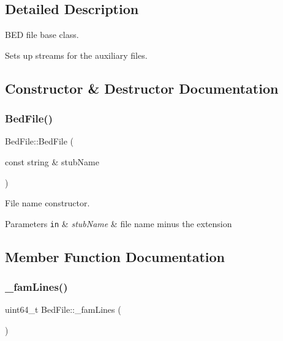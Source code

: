 \subsection{Detailed Description}
B\+ED file base class. 

Sets up streams for the auxiliary files. 

\subsection{Constructor \& Destructor Documentation}
\mbox{\label{classvarfiles_1_1_bed_file_a69631d96080c22e686e8acb75cf2cc89}} 
\subsubsection{\texorpdfstring{Bed\+File()}{BedFile()}}
{\footnotesize\ttfamily Bed\+File\+::\+Bed\+File (\begin{DoxyParamCaption}\item[{const string \&}]{stub\+Name }\end{DoxyParamCaption})}



File name constructor. 


\begin{DoxyParams}[1]{Parameters}
\mbox{\tt in}  & {\em stub\+Name} & file name minus the extension \\
\hline
\end{DoxyParams}


\subsection{Member Function Documentation}
\mbox{\label{classvarfiles_1_1_bed_file_a0e1a2245d0ed290c6d333272868d8a74}} 
\subsubsection{\texorpdfstring{\+\_\+fam\+Lines()}{\_famLines()}\hspace{0.1cm}{\footnotesize\ttfamily [1/2]}}
{\footnotesize\ttfamily uint64\+\_\+t Bed\+File\+::\+\_\+fam\+Lines (\begin{DoxyParamCaption}{ }\end{DoxyParamCaption})\hspace{0.3cm}{\ttfamily [protected]}}



